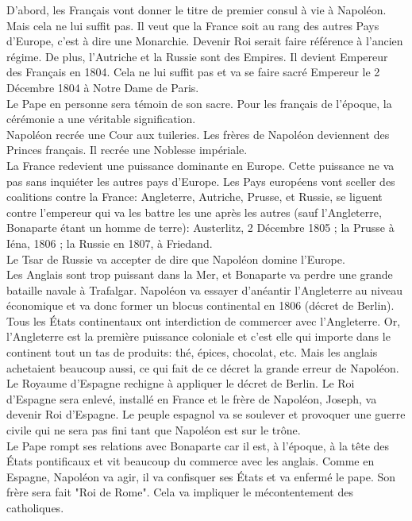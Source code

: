 \documentclass[10pt, a4paper, openany]{book}
\begin{document}
D'abord, les Français vont donner le titre de premier consul à vie à Napoléon. Mais cela ne lui suffit pas. Il veut que la France soit au rang des autres Pays d'Europe, c'est à dire une Monarchie. Devenir Roi serait faire référence à l'ancien régime. De plus, l'Autriche et la Russie sont des Empires. Il devient Empereur des Français en 1804. Cela ne lui suffit pas et va se faire sacré Empereur le 2 Décembre 1804 à Notre Dame de Paris. \\
Le Pape en personne sera témoin de son sacre. Pour les français de l'époque, la cérémonie a une véritable signification. \\
Napoléon recrée une Cour aux tuileries. Les frères de Napoléon deviennent des Princes français. Il recrée une Noblesse impériale. \\
La France redevient une puissance dominante en Europe. Cette puissance ne va pas sans inquiéter les autres pays d'Europe. Les Pays européens vont sceller des coalitions contre la France: Angleterre, Autriche, Prusse, et Russie, se liguent contre l'empereur qui va les battre les une après les autres (sauf l'Angleterre, Bonaparte étant un homme de terre): Austerlitz, 2 Décembre 1805 ; la Prusse à Iéna, 1806 ; la Russie en 1807, à Friedand. \\
Le Tsar de Russie va accepter de dire que Napoléon domine l'Europe. \\
Les Anglais sont trop puissant dans la Mer, et Bonaparte va perdre une grande bataille navale à Trafalgar. Napoléon va essayer d'anéantir l'Angleterre au niveau économique et va donc former un blocus continental en 1806 (décret de Berlin). Tous les États continentaux ont interdiction de commercer avec l'Angleterre. Or, l'Angleterre est la première puissance coloniale et c'est elle qui importe dans le continent tout un tas de produits: thé, épices, chocolat, etc. Mais les anglais achetaient beaucoup aussi, ce qui fait de ce décret la grande erreur de Napoléon. \\
Le Royaume d'Espagne rechigne à appliquer le décret de Berlin. Le Roi d'Espagne sera enlevé, installé en France et le frère de Napoléon, Joseph, va devenir Roi d'Espagne. Le peuple espagnol va se soulever et provoquer une guerre civile qui ne sera pas fini tant que Napoléon est sur le trône. \\
Le Pape rompt ses relations avec Bonaparte car il est, à l'époque, à la tête des États pontificaux et vit beaucoup du commerce avec les anglais. Comme en Espagne, Napoléon va agir, il va confisquer ses États et va enfermé le pape. Son frère sera fait "Roi de Rome". Cela va impliquer le mécontentement des catholiques. \\
\end{document}
